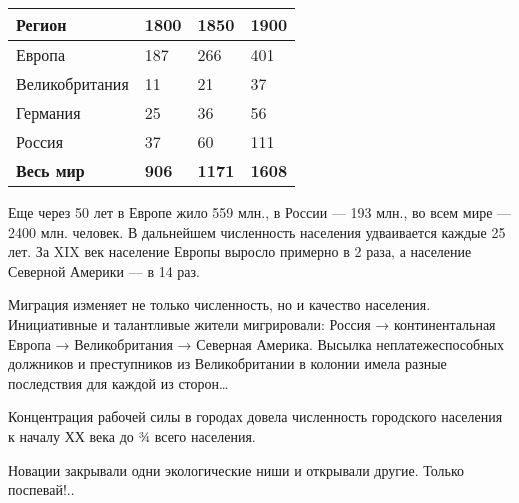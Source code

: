 \documentclass[a4paper]{article}
\begin{document}
\begin{center}
\tablefirsthead{}
\tablehead{}
\tabletail{}
\tablelasttail{}
\begin{supertabular}{|m{1.1538599in}|m{0.37685984in}|m{0.37685984in}|m{0.38375986in}|}
\hline
{\bfseries Регион} &
{\bfseries 1800} &
{\bfseries 1850} &
{\bfseries 1900}\\\hline
{ Европа} &
{ 187} &
{ 266} &
{ 401}\\\hline
{ Великобритания} &
{ 11} &
{ 21} &
{ 37}\\\hline
{ Германия} &
{ 25} &
{ 36} &
{ 56}\\\hline
{ Россия} &
{ 37} &
{ 60} &
{ 111}\\\hline
{\bfseries Весь мир} &
{\bfseries 906} &
{\bfseries 1171} &
{\bfseries 1608}\\\hline
\end{supertabular}
\end{center}
{
Еще через 50 лет в Европе жило 559 млн., в России — 193 млн., во всем мире — 2400 млн. человек. В дальнейшем численность
населения удваивается каждые 25 лет. За \foreignlanguage{english}{XIX} век население Европы выросло примерно в 2 раза,
а население Северной Америки — в 14 раз.}

{
Миграция изменяет не только численность, но и качество населения. Инициативные и талантливые жители мигрировали: Россия
→ континентальная Европа → Великобритания → Северная Америка. Высылка неплатежеспособных должников и преступников из
Великобритании в колонии имела разные последствия для каждой из сторон… \ }

{
Концентрация рабочей силы в городах довела численность городского населения к началу ХХ века до ¾ всего населения. }

{
Новации закрывали одни экологические ниши и открывали другие. Только поспевай!..}
\end{document}
